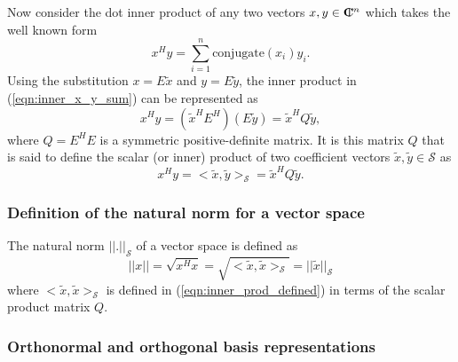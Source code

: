 Now consider the dot inner product of any two vectors $x,y\in\mbox{\textbf{C}}\hspace{-1.1ex}\mbox{l}\hspace{0.4ex}^n$ which
takes the well known form
%
\begin{equation}
x^H y = \sum_{i=1}^n \mbox{conjugate}(x_i) y_i.
\label{eqn:inner_x_y_sum}
\end{equation}
%
Using the substitution $x = E {}\tilde{x}$ and $y = E {}\tilde{y}$, the inner
product in (\ref{eqn:inner_x_y_sum}) can be represented as
%
\begin{equation}
x^H y = ( \tilde{x}^H E^H ) ( E \tilde{y} ) = \tilde{x}^H Q \tilde{y},
\label{eqn:inner_x_y_E_prod}
\end{equation}
%
where $Q = E^H E$ is a symmetric positive-definite matrix.  It is this matrix
$Q$ that is said to define the scalar (or inner) product of two coefficient
vectors $\tilde{x},\tilde{y}\in\mathcal{S}$ as
%
\begin{equation}
x^H y = <\tilde{x},\tilde{y}>_{\mathcal{S}} = \tilde{x}^H Q \tilde{y}.
\label{eqn:inner_prod_defined}
\end{equation}
%

\subsubsection{Definition of the natural norm for a vector space}

The natural norm $||.||_{\mathcal{S}}$ of a vector space is defined as
%
\begin{equation}
||x|| = \sqrt{x^H x} = \sqrt{<\tilde{x},\tilde{x}>_{\mathcal{S}}} = ||\tilde{x}||_{\mathcal{S}}
\label{eqn:natural_norm_defined}
\end{equation}
%
where $<\tilde{x},\tilde{x}>_{\mathcal{S}}$ is defined in
(\ref{eqn:inner_prod_defined}) in terms of the scalar product matrix $Q$.

\subsubsection{Orthonormal and orthogonal basis representations}

